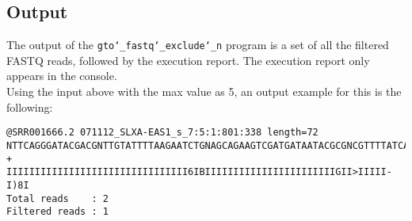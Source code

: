 \subsection*{Output}
The output of the \texttt{gto\char`_fastq\char`_exclude\char`_n} program is a set of all the filtered FASTQ reads, followed by the execution report.
The execution report only appears in the console.\\
Using the input above with the max value as 5, an output example for this is the following:
\begin{lstlisting}
@SRR001666.2 071112_SLXA-EAS1_s_7:5:1:801:338 length=72
NTTCAGGGATACGACGNTTGTATTTTAAGAATCTGNAGCAGAAGTCGATGATAATACGCGNCGTTTTATCAN
+
IIIIIIIIIIIIIIIIIIIIIIIIIIIIIIII6IBIIIIIIIIIIIIIIIIIIIIIIIGII>IIIII-I)8I
Total reads    : 2
Filtered reads : 1
\end{lstlisting}
